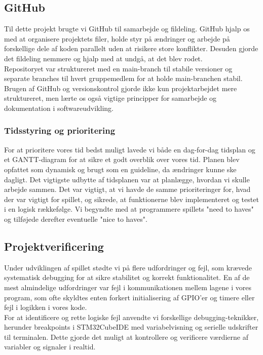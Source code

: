 \subsection{GitHub}
Til dette projekt brugte vi GitHub til samarbejde og fildeling. GitHub hjalp os med at organisere projektets filer, holde styr på ændringer og arbejde på forskellige dele af koden parallelt uden at risikere store konflikter. Desuden gjorde det fildeling nemmere og hjalp med at undgå, at det blev rodet.\\
Repositoryet var struktureret med en main-branch til stabile versioner og separate branches til hvert gruppemedlem for at holde main-branchen stabil. Brugen af GitHub og versionskontrol gjorde ikke kun projektarbejdet mere struktureret, men lærte os også vigtige principper for samarbejde og dokumentation i softwareudvikling.

\subsubsection{Tidsstyring og prioritering}
For at prioritere vores tid bedst muligt lavede vi både en dag-for-dag tidsplan og et GANTT-diagram for at sikre et godt overblik over vores tid. Planen blev opfattet som dynamisk og brugt som en guideline, da ændringer kunne ske dagligt. Det vigtigste udbytte af tidsplanen var at planlægge, hvordan vi skulle arbejde sammen. Det var vigtigt, at vi havde de samme prioriteringer for, hvad der var vigtigt for spillet, og sikrede, at funktionerne blev implementeret og testet i en logisk rækkefølge. Vi begyndte med at programmere spillets "need to haves" og tilføjede derefter eventuelle "nice to haves".

\subsection{Projektverificering}
Under udviklingen af spillet stødte vi på flere udfordringer og fejl, som krævede systematisk debugging for at sikre stabilitet og korrekt funktionalitet. En af de mest almindelige udfordringer var fejl i kommunikationen mellem lagene i vores program, som ofte skyldtes enten forkert initialisering af GPIO'er og timere eller fejl i logikken i vores kode.\\
For at identificere og rette logiske fejl anvendte vi forskellige debugging-teknikker, herunder breakpoints i STM32CubeIDE med variabelvisning og serielle udskrifter til terminalen. Dette gjorde det muligt at kontrollere og verificere værdierne af variabler og signaler i realtid.